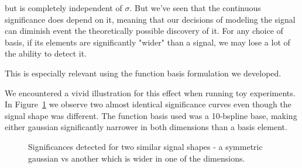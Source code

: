 \documentclass[thesis/Elad_Kliger_Thesis.tex]{subfiles}
\begin{document}
but is completely independent of $\sigma$. But we've seen that the continuous significance does depend on it, meaning that our decisions of modeling the signal can diminish event the theoretically possible discovery of it. For any choice of basis, if its elements are significantly "wider" than a signal, we may lose a lot of the ability to detect it.

This is especially relevant using the function basis formulation we developed.

We encountered a vivid illustration for this effect when running toy experiments. In Figure~\ref{fig:wide-and-narrow-gaussian-signals-significance} we observe two almost identical significance curves even though the signal shape was different. The function basis used was a 10-bspline base, making either gaussian significantly narrower in both dimensions than a basis element.

\begin{figure}
    \caption{Significances detected for two similar signal shapes - a symmetric gaussian vs another which is wider in one of the dimensions.}
    \label{fig:wide-and-narrow-gaussian-signals-significance}
\end{figure}
\end{document}

